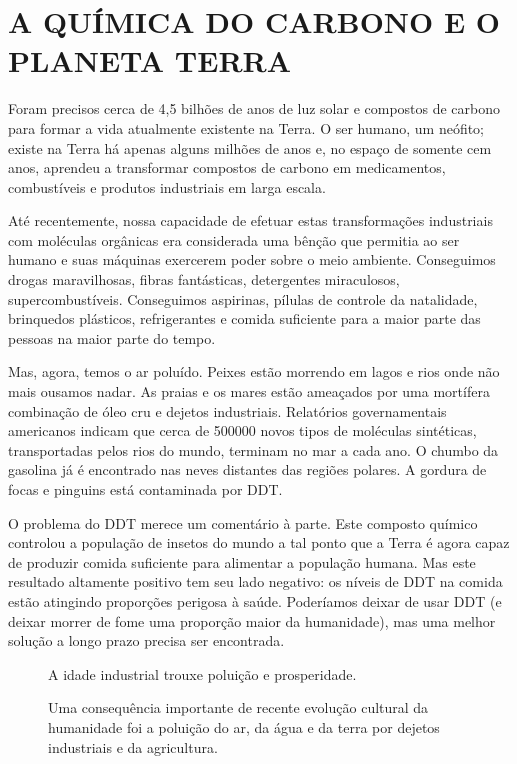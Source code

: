 \section{A QUÍMICA DO CARBONO E O PLANETA TERRA}

Foram precisos cerca de 4,5 bilhões de anos de luz solar e compostos de carbono para formar a vida atualmente existente na Terra. O ser humano, um neófito; existe na Terra há apenas alguns milhões de anos e, no espaço de somente cem anos, aprendeu a transformar compostos de carbono em medicamentos, combustíveis e produtos industriais em larga escala.

Até recentemente, nossa capacidade de efetuar estas transformações industriais com moléculas orgânicas era considerada uma bênção que permitia ao ser humano e suas máquinas exercerem poder sobre o meio ambiente. Conseguimos drogas maravilhosas, fibras fantásticas, detergentes miraculosos, supercombustíveis. Conseguimos aspirinas, pílulas de controle da natalidade, brinquedos plásticos, refrigerantes e comida suficiente para a maior parte das pessoas na maior parte do tempo. 

Mas, agora, temos o ar poluído. Peixes estão morrendo em lagos e rios onde não mais ousamos nadar. As praias e os mares estão ameaçados por uma mortífera combinação de óleo cru e dejetos industriais. Relatórios governamentais americanos indicam que cerca de 500000 novos tipos de moléculas sintéticas, transportadas pelos rios do mundo, terminam no mar a cada ano. O chumbo da gasolina já é encontrado nas neves distantes das regiões polares. A gordura de focas e pinguins está contaminada por DDT. 

O problema do DDT merece um comentário à parte. Este composto químico controlou a população de insetos do mundo a tal ponto que a Terra é agora capaz de produzir comida suficiente para alimentar a população humana. Mas este resultado altamente positivo tem seu lado negativo: os níveis de DDT na comida estão atingindo proporções perigosa à saúde. Poderíamos deixar de usar DDT (e deixar morrer de fome uma proporção maior da humanidade), mas uma melhor solução a longo prazo precisa ser encontrada. 

\begin{figure}[htbp]
    \centering
    \caption{A idade industrial trouxe poluição e prosperidade.}
    \label{fig1_3}
\end{figure}

\begin{figure}[htbp]
    \centering
    \caption{Uma consequência importante de recente evolução cultural da humanidade foi a poluição do ar, da água e da terra por dejetos industriais e da agricultura.}
    \label{fig1_4}
\end{figure}

